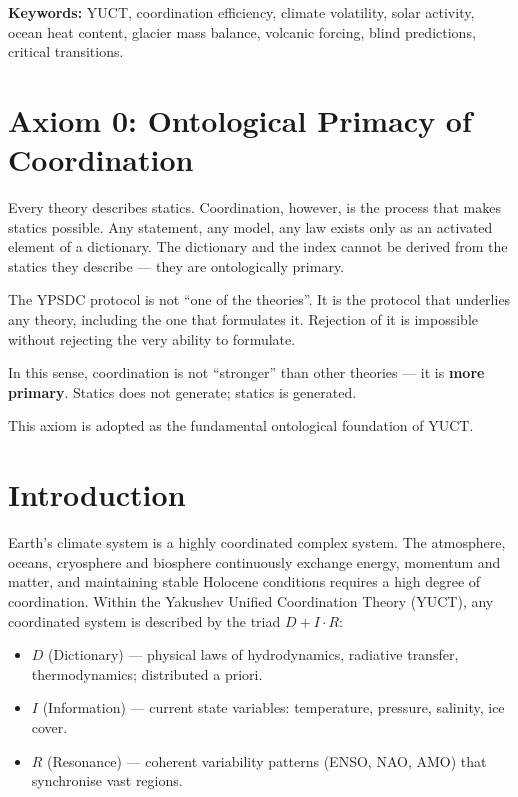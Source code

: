 \documentclass[12pt,a4paper]{article}
\begin{document}
\begin{titlepage}
		\vfill
		\small
		\textbf{Keywords:} YUCT, coordination efficiency, climate volatility, solar activity, ocean heat content, glacier mass balance, volcanic forcing, blind predictions, critical transitions.
	\end{titlepage}
	
	\tableofcontents
	
	\section*{Axiom 0: Ontological Primacy of Coordination}
	
	Every theory describes statics. Coordination, however, is the process that makes statics possible.
	Any statement, any model, any law exists only as an activated element of a dictionary.
	The dictionary and the index cannot be derived from the statics they describe — they are ontologically primary.
	
	The YPSDC protocol is not ``one of the theories''.
	It is the protocol that underlies any theory, including the one that formulates it.
	Rejection of it is impossible without rejecting the very ability to formulate.
	
	In this sense, coordination is not ``stronger'' than other theories — it is \textbf{more primary}.
	Statics does not generate; statics is generated.
	
	This axiom is adopted as the fundamental ontological foundation of YUCT.
	
	\section{Introduction}
	
	Earth's climate system is a highly coordinated complex system. The atmosphere, oceans, cryosphere and biosphere continuously exchange energy, momentum and matter, and maintaining stable Holocene conditions requires a high degree of coordination. Within the Yakushev Unified Coordination Theory (YUCT), any coordinated system is described by the triad \(D + I \cdot R\):
	
	\begin{itemize}
		\item \(D\) (Dictionary) — physical laws of hydrodynamics, radiative transfer, thermodynamics; distributed a priori.
		\item \(I\) (Information) — current state variables: temperature, pressure, salinity, ice cover.
		\item \(R\) (Resonance) — coherent variability patterns (ENSO, NAO, AMO) that synchronise vast regions.
	\end{itemize}
	
\end{document}
